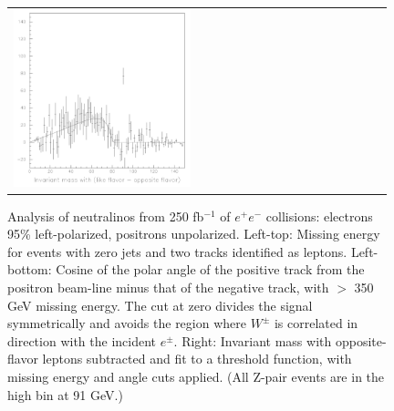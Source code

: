 \documentclass[12pt]{article}
\begin{document}
\begin{figure}[t]
\begin{center}
\begin{tabular}{p{0.49\linewidth} p{0.49\linewidth}}
      \begin{minipage}{\linewidth} \includegraphics[width=\linewidth]{jimpleftleptons_b} \end{minipage}
    \end{tabular}

    \caption{Analysis of neutralinos from 250 fb$^{-1}$ of $e^+e^-$
    collisions: electrons 95\% left-polarized, positrons unpolarized.
    Left-top: Missing energy for events with zero jets and two tracks
    identified as leptons.  Left-bottom: Cosine of the polar angle of
    the positive track from the positron beam-line minus that of the
    negative track, with $>$ 350 GeV missing energy.  The cut at zero
    divides the signal symmetrically and avoids the region where
    $W^\pm$ is correlated in direction with the incident $e^\pm$.
    Right: Invariant mass with opposite-flavor leptons subtracted and
    fit to a threshold function, with missing energy and angle cuts
    applied.  (All Z-pair events are in the high bin at 91 GeV.)}

    \label{jimpleftleptons}
  \end{center}
\end{figure}
\end{document}
